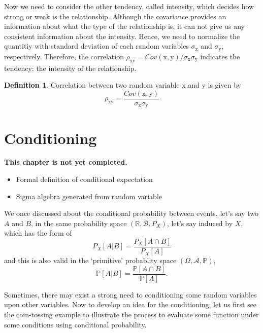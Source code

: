 \documentclass[twoside]{article}
\theoremstyle{definition}
\newtheorem{definition}{Definition}[section]
\theoremstyle{remark}
\theoremstyle{remark}
\begin{document}
Now we need to consider the other tendency, called intensity, which decides how
strong or weak is the relationship. Although the covariance provides an information
about what the type of the relationship is, it can not give us any consistent
information about the intensity. Hence, we need to normalize the quantitiy with
standard deviation of each random variables $\sigma_{\mathrm{x}}$ and $\sigma_{\mathrm{y}}$,
respectively. Therefore, the correlation $\rho_{\mathrm{xy}} = Cov(\mathrm{x},\mathrm{y})/\sigma_{\mathrm{x}}\sigma_{\mathrm{y}}$
indicates the tendency; the intensity of the relationship.
\begin{definition}
  Correlation between two random variable $\mathrm{x}$ and $\mathrm{y}$ is given by
  \begin{equation}
    \rho_{\mathrm{xy}} = \frac{Cov(\mathrm{x},\mathrm{y})}{\sigma_{\mathrm{x}}\sigma_{\mathrm{y}}}
  \end{equation}
\end{definition}


\section{Conditioning}
\textbf{This chapter is not yet completed.}
\begin{itemize}
  \item Formal definition of conditional expectation~\cite{ONLINE-2}
  \item Sigma algebra generated from random variable~\cite{ONLINE-3}
\end{itemize}

We once discussed about the conditional probability between events, let's say two
$A$ and $B$, in the same probability space $(\mathbb{R}, \mathcal{B}, P_X)$, let's
say induced by $X$, which has the form of
\begin{equation*}
  P_X[A | B] = \frac{P_X[A \cap B]}{P_X[A]}
\end{equation*}
and this is also valid in the `primitive' probablity space $(\Omega, \mathcal{A}, \mathbb{P})$,
\begin{equation*}
  \mathbb{P}[A | B] = \frac{\mathbb{P}[A \cap B]}{\mathbb{P}[A]}.
\end{equation*}

Sometimes, there may exist a strong need to conditioning some random variables upon
other variables. Now to develop an idea for the conditioning, let us first see
the coin-tossing example to illustrate the process to evaluate some function under
some conditions using conditional probability. \\
\end{document}

